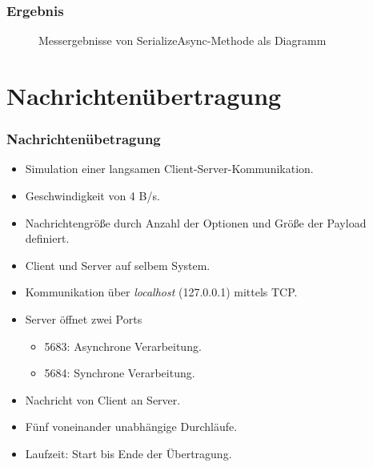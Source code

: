\documentclass[11pt,t,usepdftitle=false,aspectratio=169,usenames,dvipsnames]{beamer}
\begin{document}
    \begin{frame}
        \frametitle{Ergebnis}
        
        \begin{figure}[h]
            \centering
            \caption{Messergebnisse von SerializeAsync-Methode als Diagramm}
            \label{fig:messergebnisse-serialize-async}
        \end{figure}
    \end{frame}

    \section{Nachrichtenübertragung}
    \begin{frame}
        \frametitle{Nachrichtenübetragung}
    
        \begin{itemize}
            \item<1-> Simulation einer langsamen Client-Server-Kommunikation.
            \item<2-> Geschwindigkeit von 4 B/s.
            \item<3-> Nachrichtengröße durch Anzahl der Optionen und Größe der Payload definiert.
            \item<4-> Client und Server auf selbem System.
            \item<5-> Kommunikation über \textit{localhost} (127.0.0.1) mittels TCP.
            \item<6-> Server öffnet zwei Ports
            \begin{itemize}
                \item<7-> 5683: Asynchrone Verarbeitung.
                \item<8-> 5684: Synchrone Verarbeitung.
            \end{itemize}
            \item<9-> Nachricht von Client an Server.
            \item<10-> Fünf voneinander unabhängige Durchläufe.
            \item<11-> Laufzeit: Start bis Ende der Übertragung.
        \end{itemize}
    \end{frame}
\end{document}
